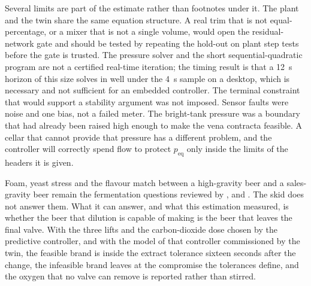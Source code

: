 Several limits are part of the estimate rather than footnotes under it. The plant and the twin share the same equation structure. A real trim that is not equal-percentage, or a mixer that is not a single volume, would open the residual-network gate and should be tested by repeating the hold-out on plant step tests before the gate is trusted. The pressure solver and the short sequential-quadratic program are not a certified real-time iteration; the timing result is that a \SI{12}{\second} horizon of this size solves in well under the \SI{4}{\second} sample on a desktop, which is necessary and not sufficient for an embedded controller. The terminal constraint that would support a stability argument was not imposed. Sensor faults were noise and one bias, not a failed meter. The bright-tank pressure was a boundary that had already been raised high enough to make the vena contracta feasible. A cellar that cannot provide that pressure has a different problem, and the controller will correctly spend flow to protect $p_{\mathrm{eq}}$ only inside the limits of the headers it is given.

Foam, yeast stress and the flavour match between a high-gravity beer and a sales-gravity beer remain the fermentation questions reviewed by \citet{stewart2010}, \citet{gibson2007} and \citet{bamforth2009}. The skid does not answer them. What it can answer, and what this estimation measured, is whether the beer that dilution is capable of making is the beer that leaves the final valve. With the three lifts and the carbon-dioxide dose chosen by the predictive controller, and with the model of that controller commissioned by the twin, the feasible brand is inside the extract tolerance sixteen seconds after the change, the infeasible brand leaves at the compromise the tolerances define, and the oxygen that no valve can remove is reported rather than stirred.
